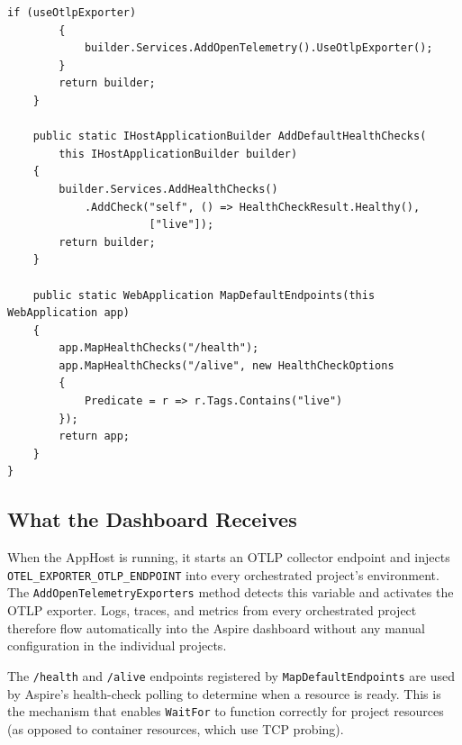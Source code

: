 \begin{lstlisting}[language={[Sharp]C}]
        if (useOtlpExporter)
        {
            builder.Services.AddOpenTelemetry().UseOtlpExporter();
        }
        return builder;
    }

    public static IHostApplicationBuilder AddDefaultHealthChecks(
        this IHostApplicationBuilder builder)
    {
        builder.Services.AddHealthChecks()
            .AddCheck("self", () => HealthCheckResult.Healthy(),
                      ["live"]);
        return builder;
    }

    public static WebApplication MapDefaultEndpoints(this WebApplication app)
    {
        app.MapHealthChecks("/health");
        app.MapHealthChecks("/alive", new HealthCheckOptions
        {
            Predicate = r => r.Tags.Contains("live")
        });
        return app;
    }
}
\end{lstlisting}

\subsection{What the Dashboard Receives}

When the AppHost is running, it starts an OTLP collector endpoint and injects \texttt{OTEL\_EXPORTER\_OTLP\_ENDPOINT} into every orchestrated project's environment. The \texttt{AddOpenTelemetryExporters} method detects this variable and activates the OTLP exporter. Logs, traces, and metrics from every orchestrated project therefore flow automatically into the Aspire dashboard without any manual configuration in the individual projects.

The \texttt{/health} and \texttt{/alive} endpoints registered by \texttt{MapDefaultEndpoints} are used by Aspire's health-check polling to determine when a resource is ready. This is the mechanism that enables \texttt{WaitFor} to function correctly for project resources (as opposed to container resources, which use TCP probing).
